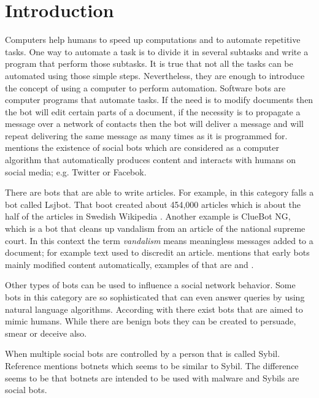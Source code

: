\documentclass[runningheads,a4paper]{llncs}
\begin{document}
\section{Introduction}
Computers help humans to speed up computations and to automate repetitive tasks. One way to automate 
a task is to divide it in several subtasks and write a program that perform those subtasks. It is true that not all the tasks can be automated
using those simple steps. Nevertheless, they are enough to introduce the concept of using a computer to perform automation. Software bots 
are computer programs that automate tasks. If the need is to modify documents then the bot will edit certain parts of a document, if the
necessity is to propagate a message over a network of contacts then the bot will deliver a message and will repeat delivering the same
message as many times as it is programmed for. \cite{ferrara:2015} mentions the existence of social bots which are considered as a computer
algorithm that automatically produces content and interacts with humans on social media; e.g. Twitter or Facebok.

There are bots that are able to write articles. For example, in this category falls a bot called Lsjbot. That boot created about 454,000 articles 
which is about the half of the articles in Swedish Wikipedia \cite{guld:2013}. Another example is ClueBot NG, which is a bot that cleans up
vandalism from an article of the national supreme court\cite{bbc07:2012}. In this context the term \emph{vandalism} means meaningless 
messages added to a document; for example text used to discredit an article. \cite{ferrara:2015} mentions that early bots mainly modified 
content automatically, examples of that are \cite{wikiWriter:2014} and \cite{wikiList:2014}.

Other types of bots can be used to influence a social network behavior. Some bots in this category are so sophisticated that can even 
answer queries by using natural language algorithms\cite{emerging:2014}. According with \cite{ferrara:2015} there exist bots that are aimed 
to mimic humans. While there are benign bots they can be created to persuade, smear or deceive also.



When multiple social bots are controlled by a person that is called Sybil\cite{ferrara:2015}. Reference \cite{kuhn:2015} mentions botnets which seems to be similar to Sybil. The difference seems to be that botnets are intended to be used with malware and Sybils are social bots.
\end{document}
